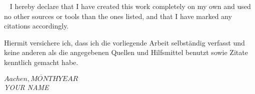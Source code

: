 
~
\vfill
I hereby declare that I have created this work completely on my own and used no other sources or tools than the ones listed, and that I have marked any citations accordingly.

Hiermit versichere ich, dass ich die vorliegende Arbeit selbst\"andig verfasst und keine anderen als die angegebenen Quellen und Hilfsmittel benutzt sowie Zitate kenntlich gemacht habe. 

\begin{flushright}
\vspace{12mm}
$\overline{Aachen, MONTH \mathit{YEAR}}$\\
\textit{YOUR NAME}
\end{flushright}
